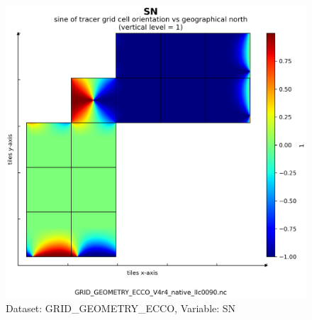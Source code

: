\begin{figure}[H]
\centering
\includegraphics[scale=0.55]{../images/plots/v4r4/native_plots_coords/Geometry_Parameters_for_the_Lat-Lon-Cap_90_(llc90)_Native_Model_Grid_(Version_4_Release_4)/SN.png}
\caption{Dataset: GRID\_GEOMETRY\_ECCO, Variable: SN}
\label{tab:table-GRID_GEOMETRY_ECCO_SN-Plot}
\end{figure}
\newpage
\pagebreak
